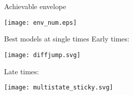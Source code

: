 \documentclass{beamer}%
\DeclareMathOperator{\SNR}{SNR}
\newcommand{\initial}{\mathcal{I}}
\begin{document}

\begin{frame}{Achievable envelope}
%
 \begin{center}
   \texttt{[image: env\_num.eps]}
 \end{center}
%
\end{frame}


\begin{frame}{Best models at single times}
%
 Early times:
 \begin{center}
   \texttt{[image: diffjump.svg]}
 \end{center}
 Late times:
 \begin{center}
   \texttt{[image: multistate\_sticky.svg]}
 \end{center}
%
\end{frame}

%
%
%
%
%
\end{document}
